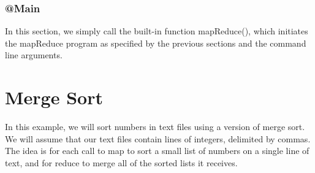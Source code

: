 \documentclass{article}
\begin{document}
\subsubsection*{@Main}
In this section, we simply call the built-in function mapReduce(), which initiates the mapReduce program as specified by the previous sections and the command line arguments.


\section*{Merge Sort}
\label{merge_sort}
In this example, we will sort numbers in text files using a version of merge sort. We will assume that our text files contain lines of integers, delimited by commas. The idea is for each call to map to sort a small list of numbers on a single line of text, and for reduce to merge all of the sorted lists it receives.
\end{document}
